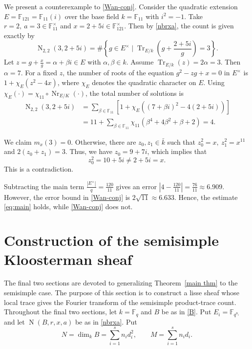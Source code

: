 \documentclass[11pt]{amsart}
\theoremstyle{remark}
\newcommand{\F}{\mathbb F}
\newcommand{\Tr}{\operatorname{Tr}}
\newcommand{\Nr}{\operatorname{Nr}}
\newcommand{\Nm}{\operatorname{N}}
\begin{document}
We present a counterexample to \eqref{Wan-conj}. Consider the quadratic extension $E = \mathbb{F}_{121} = \mathbb{F}_{11}(i)$ over the base field $k = \mathbb{F}_{11}$ with $i^2 = -1$. Take $r=2,~a = 3 \in \mathbb{F}_{11}^{\times}$ and $x = 2 + 5i \in \mathbb{F}_{121}^{\times}$. Then by \eqref{nbrxa}, the count is given exactly by
\[
\Nm_{2,2}(3, 2+5i) = \#\left\{ g \in E^{\times} \mid \Tr_{E/k}\left(g + \frac{2+5i}{g}\right) = 3 \right\}.
\]
Let $z = g + \frac{x}{g} = \alpha + \beta i \in E$ with $\alpha,\beta\in k$. Assume $\Tr_{E/k}(z) = 2\alpha = 3$. Then $\alpha =7$. For a fixed $z$, the number of roots of the equation $g^2 - zg + x = 0$ in $E^{\times}$ is $1 + \chi_E(z^2 - 4x)$, where $\chi_E$ denotes the quadratic character on $E$. Using $\chi_E(\cdot) = \chi_{11}\circ\Nr_{E/K}(\cdot)$, the total number of solutions is 
\[
\begin{aligned}
\Nm_{2,2}(3,2+5i) &= \sum_{\beta \in \mathbb{F}_{11}} \left[ 1 + \chi_E\left((7+\beta i)^2 - 4(2+5i)\right) \right]\\ 
&= 11 + \sum_{\beta \in \mathbb{F}_{11}} \chi_{11}(\beta^4 + 4\beta^2 + \beta + 2)=4.
\end{aligned}
\]

We claim $m_x(3)=0$. Otherwise, there are $z_0,z_1\in\bar{k}$ such that
$z_0^2=x,~z_1^2=x^{11}$ and 
$2(z_0+z_1)=3.$ 
Thus, we have $z_0=9+7i$, which implies that 
\[
z_0^2=10+5i\neq 2+5i=x.
\]
This is a contradiction. 

Subtracting the main term $\frac{|E^\times|}{q} = \frac{120}{11}$ gives an error $\left| 4 - \frac{120}{11} \right| = \frac{76}{11} \approx 6.909$. However, the error bound in \eqref{Wan-conj} is $2 \sqrt{11} \approx 6.633$. Hence, the estimate \eqref{eq:main} holds, while  \eqref{Wan-conj} does not. 

\section{Construction of the semisimple Kloosterman sheaf}
\label{sec:ss-regular-sheaf}

The final two sections are devoted to generalizing Theorem~\ref{main thm} to the semisimple case. The purpose of this section is to construct a lisse sheaf whose local trace gives the Fourier transform of the semisimple product-trace count. Throughout the final two sections, let $k=\F_q$ and $B$ be as in
\eqref{B}. Put $E_i=\F_{q^{n_i}}$ and let $\Nm(B,r,x,a)$ be as in
\eqref{nbrxa}.  Put
\[
 N=\dim_k B=\sum_{i=1}^{s}n_i d_{i}^2,
 \qquad M=\sum_{i=1}^{s}n_i d_i.
\]
\end{document}
